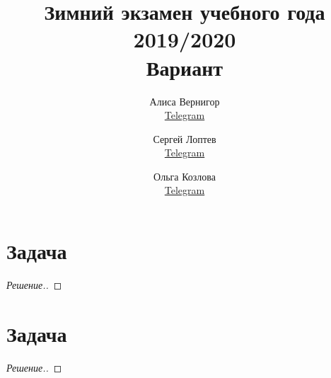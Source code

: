 \documentclass[a4paper]{article}
\title{Зимний экзамен учебного года 2019/2020\\Вариант \textnumero 1}
\author{	
    Алиса Вернигор       \\ \href{https://t.me/allisyonok}{Telegram} \and
	Сергей Лоптев        \\ \href{https://t.me/beast_sl}{Telegram} \and
	Ольга Козлова        \\ \href{https://t.me/grenlayk}{Telegram}
}
\date{}
\theoremstyle{remark}
\begin{document}
	\maketitle

    \section*{Задача }
        \begin{proof}[Решение.]
		
        \end{proof}	 
    
    \section*{Задача }
	    \begin{proof}[Решение.]
		
        \end{proof}
    
\end{document}
